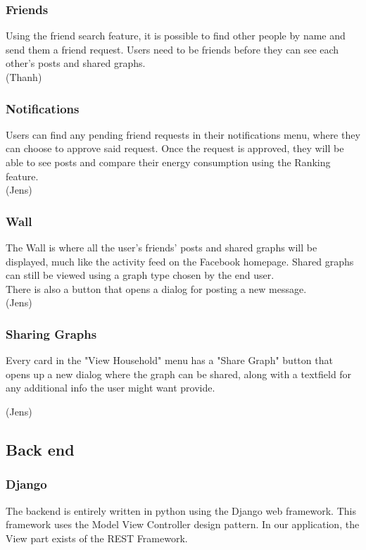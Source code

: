 \documentclass[11pt]{article}
\begin{document}
	\subsubsection{Friends}
		Using the friend search feature, it is possible to find other people by name and send them a friend request.
		Users need to be friends before they can see each other's posts and shared graphs.\\

		(Thanh)

	\subsubsection{Notifications}
		Users can find any pending friend requests in their notifications menu, where they can choose to approve said request.
		Once the request is approved, they will be able to see posts and compare their energy consumption using the Ranking feature.\\

		(Jens)

	\subsubsection{Wall}
		The Wall is where all the user's friends' posts and shared graphs will be displayed,
		much like the activity feed on the Facebook homepage.
		Shared graphs can still be viewed using a graph type chosen by the end user.\\

		There is also a button that opens a dialog for posting a new message.\\

		(Jens)

	\subsubsection{Sharing Graphs}
		Every card in the "View Household" menu has a "Share Graph" button that opens up a new dialog where the graph can be shared,
		along with a textfield for any additional info the user might want provide.

		(Jens)
		
  \subsection{Back end}
	\subsubsection{Django}
		The backend is entirely written in python using the Django web framework. This framework uses the Model View Controller design pattern. In our application, the View part exists of the REST Framework.
		
\end{document}
